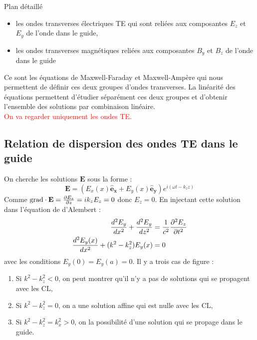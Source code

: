 \begin{reportBlock}{Plan détaillé}
  \begin{itemize}
      \item les ondes transverses électriques TE qui sont reliées aux composantes $E_z$ et $E_y$ de l'onde dans le guide,
      \item les ondes transverses magnétiques reliées aux composantes $B_y$ et $B_z$ de l'onde dans le guide
  \end{itemize}
  Ce sont les équations de Maxwell-Faraday et Maxwell-Ampère qui nous permettent de définir ces deux groupes d'ondes transverses. La linéarité des équations permettent d'étudier séparément ces deux groupes et d'obtenir l'ensemble des solutions par combinaison linéaire.\\

  \textcolor{red}{On va regarder uniquement les ondes TE.}
  
  \subsection{Relation de dispersion des ondes TE dans le guide}
  On cherche les solutions $\mathbf{E}$ sous la forme :
  \begin{equation}
      \mathbf{E} = (E_x(x)\mathbf{\hat{e}_x}+E_y(x)\mathbf{\hat{e}_y})e^{i(\omega t - k_zz)}
  \end{equation}
  Comme $\mathbf{\mathrm{grad}}\cdot\mathbf{E} = \frac{\partial E_z}{\partial z}=ik_zE_z=0$ donc $E_z=0$. En injectant cette solution dans l'équation de d'Alembert :
  \begin{align}
      \frac{d^2E_y}{dx^2} + \frac{d^2E_y}{dz^2} &= \frac{1}{c^2}\frac{\partial ^2E_z}{\partial t^2} \\
       \frac{d^2E_y(x)}{dx^2} + (k^2-k_z^2)E_y(x) &=0
  \end{align}
  avec les conditions $E_y(0)=E_y(a)=0$. Il y a trois cas de figure :
  \begin{enumerate}
      \item Si $k^2-k_z^2<0$, on peut montrer qu'il n'y a pas de solutions qui se propagent avec les CL,
      \item Si $k^2-k_z^2=0$, on a une solution affine qui est nulle avec les CL,
      \item Si $k^2-k_z^2=k_x^2>0$, on la possibilité d'une solution qui se propage dans le guide.
  \end{enumerate}


\end{reportBlock}
